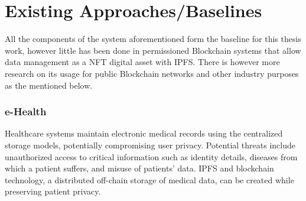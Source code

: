 \section{Existing Approaches/Baselines}
All the components of the system aforementioned form the baseline for this thesis work, however little has been done in permissioned Blockchain systems that allow data management as a \ac{NFT} digital asset with \ac{IPFS}. There is however more research on its usage for public Blockchain networks and other industry purposes as the mentioned below. 


\subsubsection{e-Health}
Healthcare systems maintain electronic medical records using the centralized storage models, potentially compromising user privacy. Potential threats include unauthorized access to critical information such as identity details, diseases from which a patient suffers, and misuse of patients' data. \ac{IPFS} and blockchain technology, a distributed off-chain storage of medical data, can be created while preserving patient privacy.

